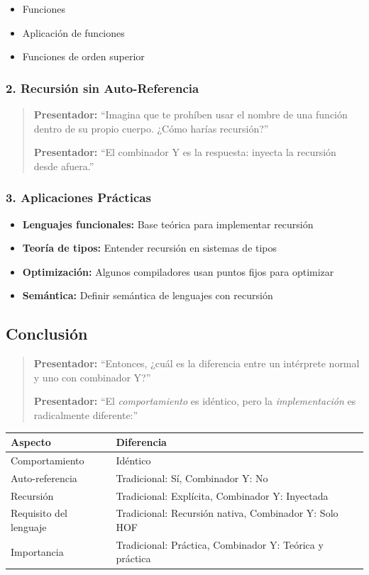 \documentclass[12pt]{article}
\begin{document}
\begin{itemize}
\item Funciones
\item Aplicación de funciones
\item Funciones de orden superior
\end{itemize}

\subsubsection*{2. Recursión sin Auto-Referencia}

\begin{quote}
\textbf{Presentador:} ``Imagina que te prohíben usar el nombre de una función dentro de su propio cuerpo. ¿Cómo harías recursión?''

\textbf{Presentador:} ``El combinador Y es la respuesta: inyecta la recursión desde afuera.''
\end{quote}

\subsubsection*{3. Aplicaciones Prácticas}

\begin{itemize}
\item \textbf{Lenguajes funcionales:} Base teórica para implementar recursión
\item \textbf{Teoría de tipos:} Entender recursión en sistemas de tipos
\item \textbf{Optimización:} Algunos compiladores usan puntos fijos para optimizar
\item \textbf{Semántica:} Definir semántica de lenguajes con recursión
\end{itemize}

\subsection*{Conclusión}

\begin{quote}
\textbf{Presentador:} ``Entonces, ¿cuál es la diferencia entre un intérprete normal y uno con combinador Y?''

\textbf{Presentador:} ``El \textit{comportamiento} es idéntico, pero la \textit{implementación} es radicalmente diferente:''
\end{quote}

\begin{center}
\begin{tabular}{|l|l|}
\hline
\textbf{Aspecto} & \textbf{Diferencia} \\
\hline
Comportamiento & Idéntico \\
Auto-referencia & Tradicional: Sí, Combinador Y: No \\
Recursión & Tradicional: Explícita, Combinador Y: Inyectada \\
Requisito del lenguaje & Tradicional: Recursión nativa, Combinador Y: Solo HOF \\
Importancia & Tradicional: Práctica, Combinador Y: Teórica y práctica \\
\hline
\end{tabular}
\end{center}
\end{document}
